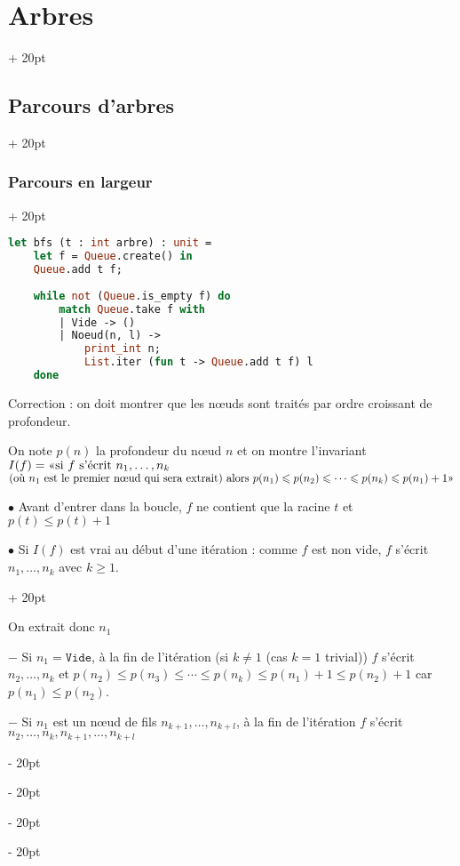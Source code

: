 \documentclass[a4paper, 12pt, twoside]{article}
\renewcommand{\le}{\leqslant}
\renewcommand{\ge}{\geqslant}
\newcommand{\ind}[1][20pt]{\advance\leftskip + #1}
\newcommand{\deind}[1][20pt]{\advance\leftskip - #1}
\newenvironment{indt}[2][20pt]{#2 \par \ind[#1]}{\par \deind} %
\begin{document}
\begin{indt}{\section{Arbres}}
\begin{indt}{\subsection{Parcours d'arbres}}
\begin{indt}{\subsubsection{Parcours en largeur}}
                \begin{lstlisting}[language=Caml, xleftmargin=80pt]
let bfs (t : int arbre) : unit =
    let f = Queue.create() in
    Queue.add t f;
    
    while not (Queue.is_empty f) do
        match Queue.take f with
        | Vide -> ()
        | Noeud(n, l) ->
            print_int n;
            List.iter (fun t -> Queue.add t f) l
    done\end{lstlisting}
                
                \vspace{12pt}
                
                Correction : on doit montrer que les n\oe uds sont traités par ordre croissant de profondeur.
                
                On note $p(n)$ la profondeur du n\oe ud $n$ et on montre l'invariant $I(f) = \text{\guillemotleft}\text{si $f$ s'écrit}\ n_1, \ldots, n_k$ $\text{(où $n_1$ est le premier n\oe ud qui sera extrait) alors}\ p(n_1) \le p(n_2) \le \cdots \le p(n_k) \le p(n_1) + 1\text{\guillemotright}$
                
                \vspace{6pt}
                
                $\bullet$ Avant d'entrer dans la boucle, $f$ ne contient que la racine $t$ et $p(t) \le p(t) + 1$
                
                \begin{indt}{$\bullet$ Si $I(f)$ est vrai au début d'une itération : comme $f$ est non vide, $f$ s'écrit $n_1, \ldots, n_k$ avec $k \ge 1$.}
                    
                    On extrait donc $n_1$
                    
                    $-$ Si $n_1 = \mathtt{Vide}$, à la fin de l'itération (si $k \neq 1$ (cas $k = 1$ trivial)) $f$ s'écrit $n_2, \ldots, n_k$ et $p(n_2) \le p(n_3) \le \cdots \le p(n_k) \le p(n_1) + 1 \le p(n_2) + 1$ car $p(n_1) \le p(n_2)$.
                    
                    \newpage
                    
                    $-$ Si $n_1$ est un n\oe ud de fils $n_{k + 1}, \ldots, n_{k + l}$, à la fin de l'itération $f$ s'écrit
                    \newline
                    $n_2, \ldots, n_k, n_{k + 1}, \ldots, n_{k + l}$
                    

\end{indt}
\end{indt}
\end{indt}
\end{indt}
\end{document}
